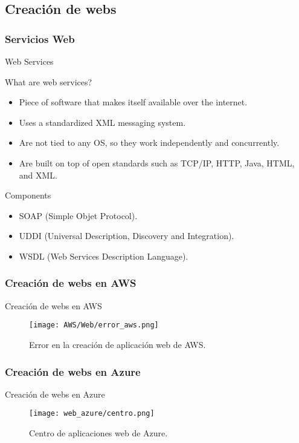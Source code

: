 \documentclass[aspectratio=169]{beamer}
\begin{document}
\subsection{Creación de webs}
\subsubsection{Servicios Web}
\begin{frame}{Web Services}
\begin{block}{What are web services?}
	\begin{itemize}
		\item Piece of software that makes itself available over the internet.
		\item Uses a standardized XML messaging system.
		\item Are not tied to any OS, so they work independently and concurrently.
		\item Are built on top of open standards such as TCP/IP, HTTP, Java, HTML, and XML.
	\end{itemize}
\end{block}
\begin{block}{Components}
	\begin{itemize}
		\item SOAP (Simple Objet Protocol).
		\item UDDI (Universal Description, Discovery and Integration).
		\item WSDL (Web Services Description Language).
	\end{itemize}
\end{block}
\end{frame}

\subsubsection{Creación de webs en AWS}
\begin{frame}{Creación de webs en AWS}
	\begin{figure}[h]
		\centering
		\texttt{[image: AWS/Web/error\_aws.png]}
		\caption{Error en la creación de aplicación web de AWS.}
		\label{Error AWS}
	\end{figure}
\end{frame}

\subsubsection{Creación de webs en Azure}
\begin{frame}{Creación de webs en Azure}
	\begin{figure}[h]
		\centering
		\texttt{[image: web\_azure/centro.png]}
		\caption{Centro de aplicaciones web de Azure.}
		\label{Centro de aplicaciones web de Azure}
	\end{figure}
\end{frame}
\end{document}
